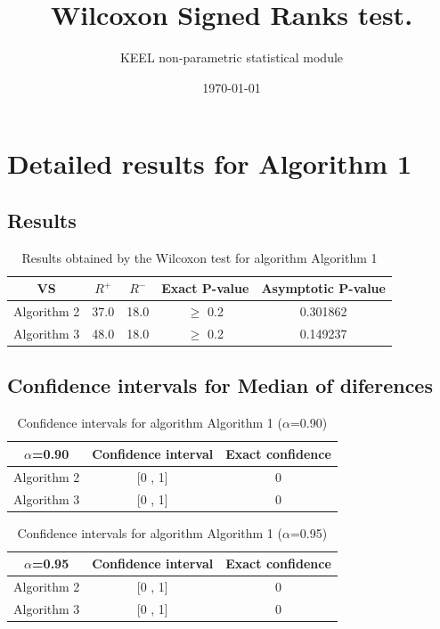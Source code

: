 \documentclass[a4paper,10pt]{article}
\title{Wilcoxon Signed Ranks test.}
\date{\today}
\author{KEEL non-parametric statistical module}
\begin{document}
\pagestyle{empty}
\maketitle
\thispagestyle{empty}



\section{Detailed results for Algorithm 1}


\subsection{Results}

\begin{table}[!htp]
\centering\small
\begin{tabular}{
|c|c|c|c|c|}
\hline
 VS & $R^{+}$ & $R^{-}$ & Exact P-value & Asymptotic P-value \\ \hline 
Algorithm 2 & 37.0 & 18.0 & $\geq$ 0.2 & 0.301862\\ \hline 
Algorithm 3 & 48.0 & 18.0 & $\geq$ 0.2 & 0.149237\\ \hline 

\end{tabular}
\caption{Results obtained by the Wilcoxon test for algorithm Algorithm 1}
\end{table}

\subsection{Confidence intervals for Median of diferences}

\begin{table}[!htp]
\centering\small
\begin{tabular}{
|c|c|c|}
\hline
 $\alpha$=0.90 & Confidence interval & Exact confidence \\ \hline 
Algorithm 2 & [0 , 1] & 0\\ \hline 
Algorithm 3 & [0 , 1] & 0\\ \hline 

\end{tabular}
\caption{Confidence intervals for algorithm Algorithm 1 ($\alpha$=0.90)}
\end{table}
\begin{table}[!htp]
\centering\small
\begin{tabular}{
|c|c|c|}
\hline
 $\alpha$=0.95 & Confidence interval & Exact confidence \\ \hline 
Algorithm 2 & [0 , 1] & 0\\ \hline 
Algorithm 3 & [0 , 1] & 0\\ \hline 

\end{tabular}
\caption{Confidence intervals for algorithm Algorithm 1 ($\alpha$=0.95)}
\end{table}
\end{document}
